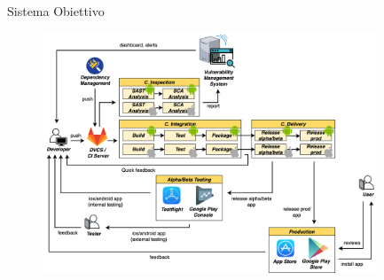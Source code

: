 \begin{frame}{Sistema Obiettivo}
    \begin{figure}[H]
        \includegraphics[width=0.89\textwidth]{img/full-cicd.png}
    \end{figure}
\end{frame}